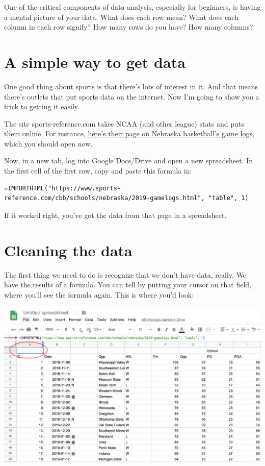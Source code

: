 \documentclass[]{book}
\begin{document}
One of the critical components of data analysis, especially for
beginners, is having a mental picture of your data. What does each row
mean? What does each column in each row signify? How many rows do you
have? How many columns?

\section{A simple way to get data}\label{a-simple-way-to-get-data}

One good thing about sports is that there's lots of interest in it. And
that means there's outlets that put sports data on the internet. Now I'm
going to show you a trick to getting it easily.

The site sports-reference.com takes NCAA (and other league) stats and
puts them online. For instance,
\href{https://www.sports-reference.com/cbb/schools/nebraska/2019-gamelogs.html}{here's
their page on Nebraska basketball's game logs}, which you should open
now.

Now, in a new tab, log into Google Docs/Drive and open a new
spreadsheet. In the first cell of the first row, copy and paste this
formula in:

\begin{verbatim}
=IMPORTHTML("https://www.sports-reference.com/cbb/schools/nebraska/2019-gamelogs.html", "table", 1)
\end{verbatim}

If it worked right, you've got the data from that page in a spreadsheet.

\section{Cleaning the data}\label{cleaning-the-data}

The first thing we need to do is recognize that we don't have data,
really. We have the results of a formula. You can tell by putting your
cursor on that field, where you'll see the formula again. This is where
you'd look:

\includegraphics[width=33.28in]{images/clean1}
\end{document}

